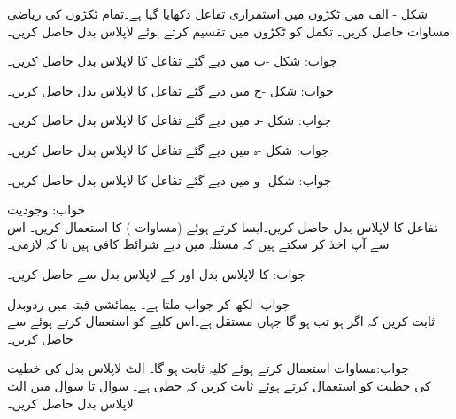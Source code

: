 شکل - الف    میں ٹکڑوں میں استمراری تفاعل دکھایا گیا ہے۔تمام ٹکڑوں کی ریاضی مساوات حاصل کریں۔ تکمل    کو ٹکڑوں میں تقسیم کرتے ہوئے لاپلاس بدل حاصل کریں۔

جواب:
شکل -ب میں دیے گئے تفاعل کا لاپلاس بدل حاصل کریں۔

جواب:
شکل -ج میں دیے گئے تفاعل کا لاپلاس بدل حاصل کریں۔

جواب:
شکل -د    میں دیے گئے تفاعل کا لاپلاس بدل حاصل کریں۔

جواب:
شکل -ہ   میں دیے گئے تفاعل کا لاپلاس بدل حاصل کریں۔

جواب:
شکل -و  میں دیے گئے تفاعل کا لاپلاس بدل حاصل کریں۔

جواب:
\quad وجودیت\\
تفاعل  کا لاپلاس بدل حاصل کریں۔ایسا کرتے ہوئے  (مساوات ) کا استعمال کریں۔ اس سے آپ اخذ کر سکتے ہیں کہ مسئلہ  میں دیے شرائط کافی ہیں نا کہ لازمی۔

جواب:
 کا لاپلاس بدل  اور  کے لاپلاس بدل سے حاصل کریں۔

جواب: لکھ کر جواب  ملتا ہے۔
\quad پیمائشی فیتہ میں ردوبدل\\
ثابت کریں کہ اگر   ہو تب  ہو گا جہاں  مستقل ہے۔اس کلیے کو استعمال کرتے ہوئے  سے  حاصل کریں۔

جواب:مساوات  استعمال کرتے ہوئے کلیہ ثابت ہو گا۔
\quad الٹ لاپلاس بدل کی خطیت\\
 کی خطیت کو استعمال کرتے ہوئے ثابت کریں کہ  خطی ہے۔
سوال  تا سوال  میں الٹ لاپلاس بدل حاصل کریں۔


